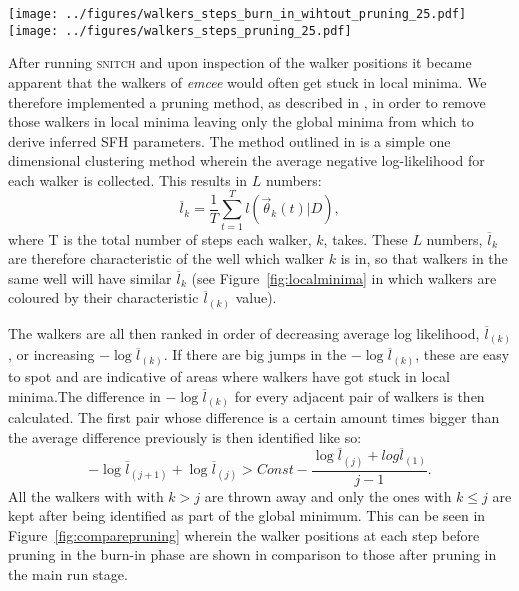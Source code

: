 \documentclass[useAMS,usenatbib]{mn2e}
\begin{document}
\begin{figure*}
\centering
\texttt{[image: ../figures/walkers\_steps\_burn\_in\_wihtout\_pruning\_25.pdf]}
\texttt{[image: ../figures/walkers\_steps\_pruning\_25.pdf]}
\caption{The positions traced by the \emph{emcee} walkers with step number (i.e. time) in each of the $[Z, t_q, \tau]$ dimensions during the burn in phase before pruning (left) and the post burn-in phase after pruning (right). The red lines show the known true values in each panel. Walkers have got stuck in local minima (see Figure±\ref{fig:localminima}) but some have managed to find the global minimum which can be seen more clearly in the right hand panels.}
\label{fig:comparepruning}
\end{figure*}

After running \textsc{snitch} and upon inspection of the walker positions it became apparent that the walkers of \emph{emcee} would often get stuck in local minima. We therefore implemented a pruning method, as described in \cite{hou12}, in order to remove those walkers in local minima leaving only the global minima from which to derive inferred SFH parameters. The method outlined in \cite{hou12} is a simple one dimensional clustering method wherein the average negative log-likelihood for each walker is collected. This results in $L$ numbers:
\begin{equation}
\overline{l}_k = \frac{1}{T} \sum^{T}_{t=1} l(\vec{\theta}_k(t)|D),
\end{equation}
where T is the total number of steps each walker, $k$, takes. These $L$ numbers, $\overline{l}_k$ are therefore characteristic of the well which walker $k$ is in, so that walkers in the same well will have similar $\overline{l}_k$ (see Figure~\ref{fig:localminima} in which walkers are coloured by their characteristic $\overline{l}_{(k)}$ value). 


The walkers are all then ranked in order of decreasing average log likelihood, $\overline{l}_{(k)}$, or increasing $- \log \overline{l}_{(k)}$. If there are big jumps in the $- \log \overline{l}_{(k)}$, these are easy to spot and are indicative of areas where walkers have got stuck in local minima.The difference in $- \log \overline{l}_{(k)}$ for every adjacent pair of walkers is then calculated. The first pair whose difference is a certain amount times bigger than the average difference previously is then identified like so:
\begin{equation}
-\log \overline{l}_{(j+1)} + \log \overline{l}_{(j)} > Const − \frac{\log \overline{l}_{(j)} + log \overline{l}_{(1)}}{j - 1}.
\end{equation}
All the walkers with with $k>j$ are thrown away and only the ones with $k \leq j$ are kept after being identified as part of the global minimum. This can be seen in Figure~\ref{fig:comparepruning} wherein the walker positions at each step before pruning in the burn-in phase are shown in comparison to those after pruning in the main run stage.
\end{document}
